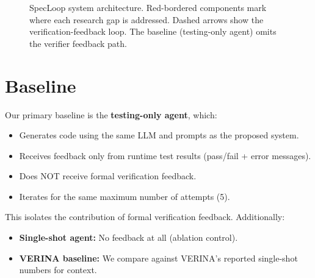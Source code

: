 \documentclass[11pt,a4paper]{article}
\begin{document}
\begin{figure}[H]
\caption{SpecLoop system architecture. Red-bordered components mark where each research gap is addressed. Dashed arrows show the verification-feedback loop. The baseline (testing-only agent) omits the verifier feedback path.}
\label{fig:architecture}
\end{figure}


\section{Baseline}

Our primary baseline is the \textbf{testing-only agent}, which:
\begin{itemize}[noitemsep]
    \item Generates code using the same LLM and prompts as the proposed system.
    \item Receives feedback only from runtime test results (pass/fail + error messages).
    \item Does NOT receive formal verification feedback.
    \item Iterates for the same maximum number of attempts (5).
\end{itemize}

This isolates the contribution of formal verification feedback. Additionally:
\begin{itemize}[noitemsep]
    \item \textbf{Single-shot agent:} No feedback at all (ablation control).
    \item \textbf{VERINA baseline:} We compare against VERINA's reported single-shot numbers for context.
\end{itemize}
\end{document}
